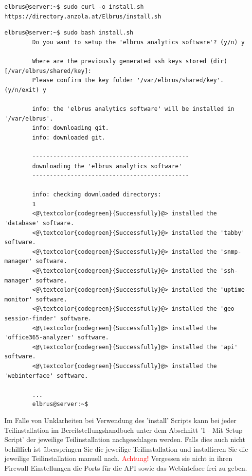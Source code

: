 \documentclass{article}
\begin{document}
	\lstset{style=commands}
	\begin{lstlisting}[caption={Installieren des 'install' Script.}]
		elbrus@server:~$ sudo curl -o install.sh https://directory.anzola.at/Elbrus/install.sh
	\end{lstlisting}

	\begin{lstlisting}[caption={Ausführen des 'install' Script.}]
		elbrus@server:~$ sudo bash install.sh
		Do you want to setup the 'elbrus analytics software'? (y/n) y
		
		Where are the previously generated ssh keys stored (dir) [/var/elbrus/shared/key]:
		Please confirm the key folder '/var/elbrus/shared/key'. (y/n/exit) y
		
		info: the 'elbrus analytics software' will be installed in '/var/elbrus'.
		info: downloading git.
		info: downloaded git.
		
		---------------------------------------------
		downloading the 'elbrus analytics software'
		---------------------------------------------
		
		info: checking downloaded directorys:
		1
		<@\textcolor{codegreen}{Successfully}@> installed the 'database' software.
		<@\textcolor{codegreen}{Successfully}@> installed the 'tabby' software.
		<@\textcolor{codegreen}{Successfully}@> installed the 'snmp-manager' software.
		<@\textcolor{codegreen}{Successfully}@> installed the 'ssh-manager' software.
		<@\textcolor{codegreen}{Successfully}@> installed the 'uptime-monitor' software.
		<@\textcolor{codegreen}{Successfully}@> installed the 'geo-session-finder' software.
		<@\textcolor{codegreen}{Successfully}@> installed the 'office365-analyzer' software.
		<@\textcolor{codegreen}{Successfully}@> installed the 'api' software.
		<@\textcolor{codegreen}{Successfully}@> installed the 'webinterface' software.
		
		...
		elbrus@server:~$
	\end{lstlisting}
	Im Falle von Unklarheiten bei Verwendung des 'install' Scripts kann bei jeder Teilinstallation im Bereitstellungshandbuch unter dem Abschnitt '1 - Mit Setup Script' der jeweilige Teilinstallation nachgeschlagen werden. Falls dies auch nicht behilflich ist überspringen Sie die jeweilige Teilinstallation und installieren Sie die jeweilige Teilinstallation manuell nach.
	\newline \newline \newline \newline \newline \newline \newline \newline \newline \newline \newline
	\textcolor{red}{Achtung!} Vergessen sie nicht in ihren Firewall Einstellungen die Ports für die API sowie das Webinteface frei zu geben.
	\newpage
	
\end{document}
